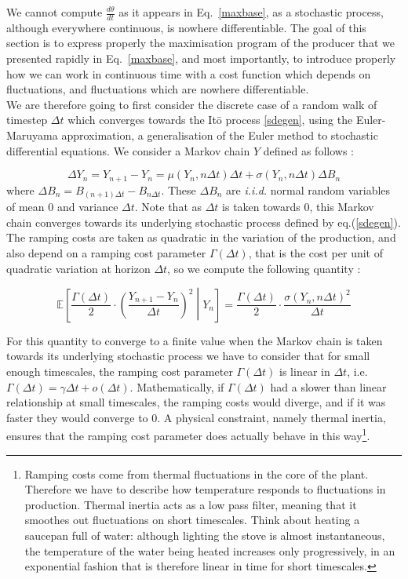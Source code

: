 We cannot compute $\frac{d\theta}{dt}$ as it appears in Eq.~\ref{maxbase}, as a stochastic process, although everywhere continuous, is nowhere differentiable. The goal of this section is to express properly the maximisation program of the producer that we presented rapidly in Eq.~\ref{maxbase}, and most importantly, to introduce properly how we can work in continuous time with a cost function which depends on fluctuations, and fluctuations which are nowhere differentiable.\\

We are therefore going to first consider the discrete case of a random walk of timestep $\Delta t$ which converges towards the It\={o} process \ref{sdegen}, using the Euler-Maruyama approximation, a generalisation of the Euler method to stochastic differential equations. We consider a Markov chain $Y$ defined as follows : 

\begin{equation}
\Delta Y_n=Y_{n+1}-Y_n= \mu(Y_n,n \Delta t)\Delta t+\sigma (Y_n,n \Delta t)\Delta B_n
\end{equation}
where $\Delta B_n=B_{(n+1)\Delta t}-B_{n\Delta t}$. These $\Delta B_n$ are \emph{i.i.d.} normal random variables of mean $0$ and variance $\Delta t$. Note that as $\Delta t$ is taken towards $0$, this Markov chain converges towards its underlying stochastic process defined by eq.(\ref{sdegen}).\\

The ramping costs are taken as quadratic in the variation of the production, and also depend on a ramping cost parameter $\Gamma(\Delta t)$, that is the cost per unit of quadratic variation at horizon $\Delta t$, so we compute the following quantity : 

\begin{equation}
\mathbb{E}\left[\frac{\Gamma(\Delta t)}{2}\cdot\left(\frac{Y_{n+1}-Y_n}{\Delta t}\right)^2\middle \vert Y_n  \right]=\frac{\Gamma(\Delta t)}{2}\cdot\frac{\sigma (Y_n,n \Delta t)^2}{\Delta t}
\label{markovariation}
\end{equation}

For this quantity to converge to a finite value when the Markov chain is taken towards its underlying stochastic process we have to consider that for small enough timescales, the ramping cost parameter $\Gamma(\Delta t)$ is linear in $\Delta t$, i.e. $\Gamma(\Delta t)=\gamma \Delta t +o(\Delta t)$. Mathematically, if $\Gamma(\Delta t)$ had a slower than linear relationship at small timescales, the ramping costs would diverge, and if it was faster they would converge to $0$. A physical constraint, namely thermal inertia, ensures that the ramping cost parameter does actually behave in this way\footnote{Ramping costs come from thermal fluctuations in the core of the plant. Therefore we have to describe how temperature responds to fluctuations in production. Thermal inertia acts as a low pass filter, meaning that it smoothes out fluctuations on short timescales. Think about heating a saucepan full of water: although lighting the stove is almost instantaneous, the temperature of the water being heated increases only progressively, in an exponential fashion that is therefore linear in time for short timescales. }. \\

